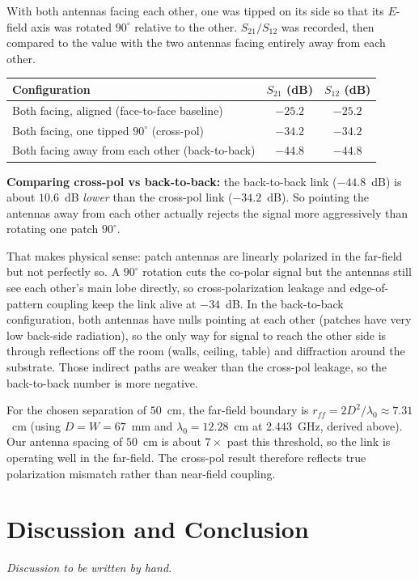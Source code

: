 \documentclass[11pt,letterpaper]{article}
\begin{document}
With both antennas facing each other, one was tipped on its side so that its $E$-field axis was rotated $90^\circ$ relative to the other. $S_{21}/S_{12}$ was recorded, then compared to the value with the two antennas facing entirely away from each other.

\begin{center}
\begin{tabular}{lcc}
\toprule
Configuration & $S_{21}$ (dB) & $S_{12}$ (dB) \\
\midrule
Both facing, aligned (face-to-face baseline)     & $-25.2$ & $-25.2$ \\
Both facing, one tipped $90^\circ$ (cross-pol)    & $-34.2$ & $-34.2$ \\
Both facing away from each other (back-to-back)   & $-44.8$ & $-44.8$ \\
\bottomrule
\end{tabular}
\end{center}

\textbf{Comparing cross-pol vs back-to-back:} the back-to-back link ($-44.8$~dB) is about $10.6$~dB \emph{lower} than the cross-pol link ($-34.2$~dB). So pointing the antennas away from each other actually rejects the signal more aggressively than rotating one patch $90^\circ$.

That makes physical sense: patch antennas are linearly polarized in the far-field but not perfectly so. A $90^\circ$ rotation cuts the co-polar signal but the antennas still see each other's main lobe directly, so cross-polarization leakage and edge-of-pattern coupling keep the link alive at $-34$~dB. In the back-to-back configuration, both antennas have nulls pointing at each other (patches have very low back-side radiation), so the only way for signal to reach the other side is through reflections off the room (walls, ceiling, table) and diffraction around the substrate. Those indirect paths are weaker than the cross-pol leakage, so the back-to-back number is more negative.

For the chosen separation of $50$~cm, the far-field boundary is $r_{ff} = 2D^2/\lambda_0 \approx 7.31$~cm (using $D = W = 67$~mm and $\lambda_0 = 12.28$~cm at 2.443~GHz, derived above). Our antenna spacing of $50$~cm is about $7\times$ past this threshold, so the link is operating well in the far-field. The cross-pol result therefore reflects true polarization mismatch rather than near-field coupling.

\section{Discussion and Conclusion}

\textit{Discussion to be written by hand.}


\vspace{2cm}
\end{document}
